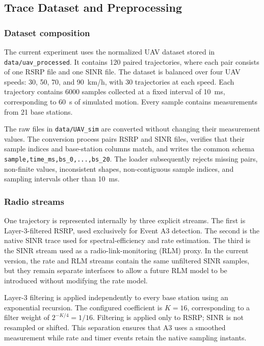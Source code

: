 \subsection{Trace Dataset and Preprocessing}
\label{subsec:trace-data}

\subsubsection{Dataset composition}

The current experiment uses the normalized UAV dataset stored in
\texttt{data/uav\_processed}. It contains 120 paired trajectories, where each
pair consists of one RSRP file and one SINR file. The dataset is balanced over
four UAV speeds: 30, 50, 70, and 90~km/h, with 30 trajectories at each speed.
Each trajectory contains 6000 samples collected at a fixed interval of 10~ms,
corresponding to 60~s of simulated motion. Every sample contains measurements
from 21 base stations.

The raw files in \texttt{data/UAV\_sim} are converted without changing their
measurement values. The conversion process pairs RSRP and SINR files, verifies
that their sample indices and base-station columns match, and writes the common
schema
\texttt{sample,time\_ms,bs\_0,...,bs\_20}. The loader subsequently rejects
missing pairs, non-finite values, inconsistent shapes, non-contiguous sample
indices, and sampling intervals other than 10~ms.

\subsubsection{Radio streams}

One trajectory is represented internally by three explicit streams. The first
is Layer-3-filtered RSRP, used exclusively for Event A3 detection. The second
is the native SINR trace used for spectral-efficiency and rate estimation. The
third is the SINR stream used as a radio-link-monitoring (RLM) proxy. In the
current version, the rate and RLM streams contain the same unfiltered SINR
samples, but they remain separate interfaces to allow a future RLM model to be
introduced without modifying the rate model.

Layer-3 filtering is applied independently to every base station using an
exponential recursion. The configured coefficient is $K=16$, corresponding to
a filter weight of $2^{-K/4}=1/16$. Filtering is applied only to RSRP; SINR is
not resampled or shifted. This separation ensures that A3 uses a smoothed
measurement while rate and timer events retain the native sampling instants.

